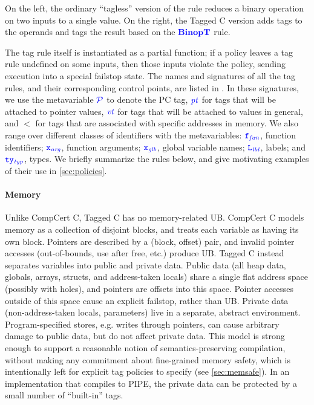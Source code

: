 \documentclass{llncs}
\begin{document}
\begin{minipage}[t]{0.37\textwidth}
  \binopsteptagless
\end{minipage}
\begin{minipage}[t]{0.6\textwidth}
  \binopstepnolabel
\end{minipage}

\noindent
On the left, the ordinary ``tagless'' version of the rule reduces a
binary operation on two inputs to a single value.
On the right, the Tagged C version adds tags to the operands and tags the result
based on the \(\color{blue} \mathbf{BinopT}\) rule.

The tag rule itself is instantiated as a partial function; if a policy leaves a tag rule
undefined on some inputs, then those inputs violate the policy, sending
execution into a special failstop state. The names and signatures of all the tag rules,
and their corresponding control points, are listed in .
In these signatures, we use the metavariable \(\mathcal{\color{blue} P\mathit{}}\) to denote the PC tag,
\(\mathit{\color{blue} pt}\) for tags that will be attached to pointer values, \(\mathit{\color{blue} vt}\) for tags that will be
attached to values in general, and \(\lt\) for tags that are associated with
specific addresses in memory. We also range over different classes of identifiers
with the metavariables: \(\mathtt{\color{blue} f}_{\color{blue} \mathit{fun}}\), function identifiers; \(\mathtt{\color{blue} x}_{\color{blue} \mathit{arg}}\), function arguments;
\(\mathtt{\color{blue} x}_{\color{blue} \mathit{glb}}\), global variable names; \(\mathtt{\color{blue} L}_{\color{blue} \mathit{lbl}}\), labels; and \(\mathtt{\color{blue} ty}_{\color{blue} \mathit{typ}}\), types.
We briefly summarize the rules below, and give motivating examples of their use in
\cref{sec:policies}.

\paragraph{Memory} Unlike CompCert C, Tagged C has no memory-related UB.
CompCert C models memory as a collection of disjoint blocks,
and treats each variable as having its own block. Pointers are described by a (block, offset) pair,
and invalid pointer accesses (out-of-bounds, use after free, etc.) produce UB.
Tagged C instead separates variables
into public and private data. Public data (all heap data, globals, arrays, structs, and
address-taken locals) share a single flat address space (possibly with holes), and pointers are
offsets into this space. Pointer accesses outside of this space cause
an explicit failstop, rather than UB. 
Private data (non-address-taken locals, parameters) live in a separate, abstract environment.
Program-specified stores, e.g. writes through pointers, can cause arbitrary damage to public
data, but do not affect private data. 
This model is strong enough to support a reasonable
notion of semantics-preserving compilation, without making any commitment about fine-grained
memory safety, which is intentionally left for explicit tag policies to specify
(see \cref{sec:memsafe}).
In an implementation that compiles to PIPE, the private data can be protected by a small number of
``built-in'' tags.
\end{document}
